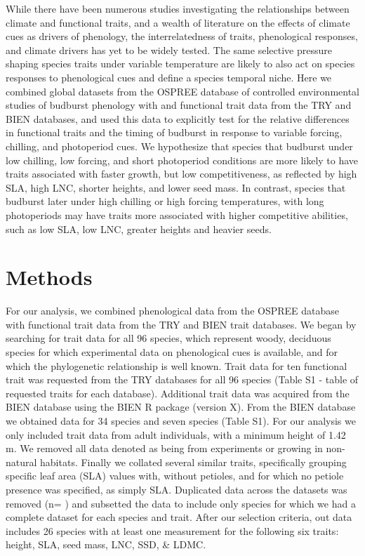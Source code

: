 \documentclass{article}\usepackage[]{graphicx}\usepackage[]{color}
\begin{document}
While there have been numerous studies investigating the relationships between climate and functional traits, and a wealth of literature on the effects of climate cues as drivers of phenology, the interrelatedness of traits, phenological responses, and climate drivers has yet to be widely tested. The same selective pressure shaping species traits under variable temperature are likely to also act on species responses to phenological cues and define a species temporal niche. Here we combined global datasets from the OSPREE database of controlled environmental studies of budburst phenology with and functional trait data from the TRY and BIEN databases, and used this data to explicitly test for the relative differences in functional traits and the timing of budburst in response to variable forcing, chilling, and photoperiod cues. We hypothesize that species that budburst under low chilling, low forcing, and short photoperiod conditions are more likely to have traits associated with faster growth, but low competitiveness, as reflected by high SLA, high LNC, shorter heights, and lower seed mass. In contrast, species that budburst later under high chilling or high forcing temperatures, with long photoperiods  may have traits more associated with higher competitive abilities, such as low SLA, low LNC, greater heights and heavier seeds. 

\section{Methods}
For our analysis, we combined phenological data from the OSPREE database with functional trait data from the TRY and BIEN trait databases. We began by searching for trait data for all 96 species, which represent woody, deciduous species for which experimental data on phenological cues is available, and for which the phylogenetic relationship is well known. Trait data for ten functional trait was requested from the TRY databases for all 96 species (Table S1 - table of requested traits for each database). Additional trait data was acquired from the BIEN database using the BIEN R package (version X). From the BIEN database we obtained data for 34 species and seven species (Table S1). For our analysis we only included trait data from adult individuals, with a minimum height of 1.42 m. We removed all data denoted as being from experiments or growing in non-natural habitats. Finally we collated several similar traits, specifically grouping specific leaf area (SLA) values with, without petioles, and for which no petiole presence was specified, as simply SLA. Duplicated data across the datasets was removed (n= ) and subsetted the data to include only species for which we had a complete dataset for each species and trait. After our selection criteria, out data includes 26 species with at least one measurement for the following six traits: height, SLA, seed mass, LNC, SSD, \& LDMC.
\end{document}
